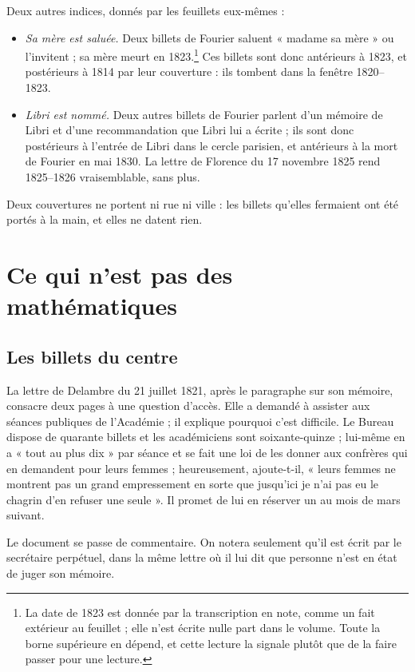 \documentclass[11pt,a4paper]{article}
\begin{document}
Deux autres indices, donnés par les feuillets eux-mêmes :
\begin{itemize}
  \item \emph{Sa mère est saluée.} Deux billets de Fourier saluent « madame sa
    mère » ou l'invitent ; sa mère meurt en 1823.\footnote{La date de 1823 est
    donnée par la transcription en note, comme un fait extérieur au feuillet ;
    elle n'est écrite nulle part dans le volume. Toute la borne supérieure en
    dépend, et cette lecture la signale plutôt que de la faire passer pour une
    lecture.} Ces billets sont donc antérieurs à 1823, et postérieurs à 1814
    par leur couverture : ils tombent dans la fenêtre 1820--1823.
  \item \emph{Libri est nommé.} Deux autres billets de Fourier parlent d'un
    mémoire de Libri et d'une recommandation que Libri lui a écrite ; ils sont
    donc postérieurs à l'entrée de Libri dans le cercle parisien, et
    antérieurs à la mort de Fourier en mai 1830. La lettre de Florence du 17
    novembre 1825 rend 1825--1826 vraisemblable, sans plus.
\end{itemize}

Deux couvertures ne portent ni rue ni ville : les billets qu'elles fermaient
ont été portés à la main, et elles ne datent rien.

\section*{Ce qui n'est pas des mathématiques}


\subsection*{Les billets du centre}

La lettre de Delambre du 21 juillet 1821, après le paragraphe sur son mémoire,
consacre deux pages à une question d'accès. Elle a demandé à assister aux
séances publiques de l'Académie ; il explique pourquoi c'est difficile. Le
Bureau dispose de quarante billets et les académiciens sont soixante-quinze ;
lui-même en a « tout au plus dix » par séance et se fait une loi de les donner
aux confrères qui en demandent pour leurs femmes ; heureusement, ajoute-t-il,
« leurs femmes ne montrent pas un grand empressement en sorte que jusqu'ici je
n'ai pas eu le chagrin d'en refuser une seule ». Il promet de lui en réserver
un au mois de mars suivant.

Le document se passe de commentaire. On notera seulement qu'il est écrit par le
secrétaire perpétuel, dans la même lettre où il lui dit que personne n'est en
état de juger son mémoire.
\end{document}
